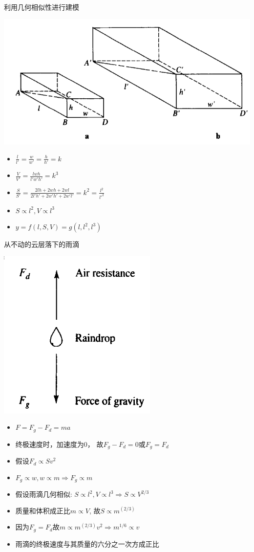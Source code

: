 \documentclass[mathserif]{beamer}
\begin{document}
\begin{frame}{利用几何相似性进行建模}
  \begin{center}
    \includegraphics[width=.4\textwidth{}]{similar.png}
  \end{center}
  \begin{itemize}
  \item $\frac{l}{l'} = \frac{w}{w'} = \frac{h}{h'} = k$
  \item $\frac{V}{V'} = \frac{lwh}{l'w'h'} = k^3$
  \item $\frac{S}{S'} = \frac{2lh+2wh+2wl}{2l'h'+2w'h'+2w'l'} = k^2 = \frac{l^2}{l'^2}$
  \item $S \propto l^2, V \propto l^3$
  \item $y = f(l, S, V) = g(l, l^2, l^3)$
  \end{itemize}

\end{frame}

\begin{frame}{从不动的云层落下的雨滴}

  \begin{center}
    \includegraphics[width=.15\textwidth{}]{rain.png}
  \end{center}

  \begin{itemize}
  \item $F = F_g - F_d = ma$
  \item 终极速度时，加速度为0， 故$F_g - F_d = 0$或$F_g = F_d$
  \item 假设$F_d \propto Sv^2$
  \item $F_g \propto w, w \propto m \Rightarrow F_g \propto m$
  \item 假设雨滴几何相似: $S \propto l^2, V \propto l^3 \Rightarrow S \propto V^{2/3}$
  \item 质量和体积成正比$m \propto V$, 故$S \propto m^(2/3)$
  \item 因为$F_g = F_d$故$m \propto m^(2/3)v^2 \Rightarrow m^{1/6} \propto v$
  \item 雨滴的终极速度与其质量的六分之一次方成正比
  \end{itemize}
\end{frame}
\end{document}
